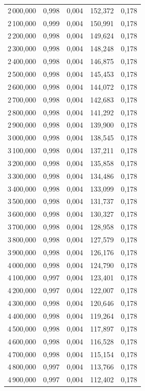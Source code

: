 \begin{longtable}{rrrrr}
2\,000,000 & 0,998 & 0,004 & 152,372 & 0,178\\
2\,100,000 & 0,999 & 0,004 & 150,991 & 0,178\\
2\,200,000 & 0,998 & 0,004 & 149,624 & 0,178\\
2\,300,000 & 0,998 & 0,004 & 148,248 & 0,178\\
2\,400,000 & 0,998 & 0,004 & 146,875 & 0,178\\
2\,500,000 & 0,998 & 0,004 & 145,453 & 0,178\\
2\,600,000 & 0,998 & 0,004 & 144,072 & 0,178\\
2\,700,000 & 0,998 & 0,004 & 142,683 & 0,178\\
2\,800,000 & 0,998 & 0,004 & 141,292 & 0,178\\
2\,900,000 & 0,998 & 0,004 & 139,900 & 0,178\\
3\,000,000 & 0,998 & 0,004 & 138,545 & 0,178\\
3\,100,000 & 0,998 & 0,004 & 137,211 & 0,178\\
3\,200,000 & 0,998 & 0,004 & 135,858 & 0,178\\
3\,300,000 & 0,998 & 0,004 & 134,486 & 0,178\\
3\,400,000 & 0,998 & 0,004 & 133,099 & 0,178\\
3\,500,000 & 0,998 & 0,004 & 131,737 & 0,178\\
3\,600,000 & 0,998 & 0,004 & 130,327 & 0,178\\
3\,700,000 & 0,998 & 0,004 & 128,958 & 0,178\\
3\,800,000 & 0,998 & 0,004 & 127,579 & 0,178\\
3\,900,000 & 0,998 & 0,004 & 126,176 & 0,178\\
4\,000,000 & 0,998 & 0,004 & 124,790 & 0,178\\
4\,100,000 & 0,997 & 0,004 & 123,401 & 0,178\\
4\,200,000 & 0,997 & 0,004 & 122,007 & 0,178\\
4\,300,000 & 0,998 & 0,004 & 120,646 & 0,178\\
4\,400,000 & 0,998 & 0,004 & 119,264 & 0,178\\
4\,500,000 & 0,998 & 0,004 & 117,897 & 0,178\\
4\,600,000 & 0,998 & 0,004 & 116,528 & 0,178\\
4\,700,000 & 0,998 & 0,004 & 115,154 & 0,178\\
4\,800,000 & 0,997 & 0,004 & 113,766 & 0,178\\
4\,900,000 & 0,997 & 0,004 & 112,402 & 0,178\\

\end{longtable}
